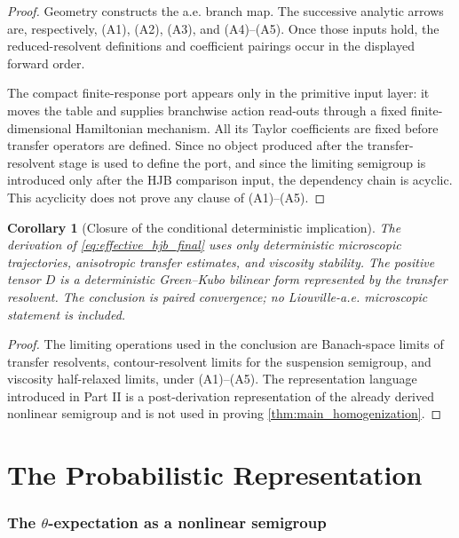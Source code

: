 \documentclass[12pt, letterpaper]{amsart}
\newcommand{\ThetaExpectation}{$\theta$-expectation}
\theoremstyle{plain}
\newtheorem{corollary}[theorem]{Corollary}
\theoremstyle{definition}
\theoremstyle{remark}
\begin{document}
\begin{proof}
Geometry constructs the a.e. branch map.  The successive analytic arrows are,
respectively, \textup{(A1)}, \textup{(A2)}, \textup{(A3)}, and
\textup{(A4)--(A5)}.  Once those inputs hold, the reduced-resolvent definitions
and coefficient pairings occur in the displayed forward order.

The compact finite-response port appears only in the primitive input layer: it
moves the table and supplies branchwise action read-outs through a fixed
finite-dimensional Hamiltonian mechanism.  All its Taylor coefficients are fixed
before transfer operators are defined.  Since no object produced after the
transfer-resolvent stage is used to define the port, and since the limiting
semigroup is introduced only after the HJB comparison input, the dependency
chain is acyclic.  This acyclicity does not prove any clause of
\textup{(A1)--(A5)}.
\end{proof}

\begin{corollary}[Closure of the conditional deterministic implication]
\label{cor:no_probability_in_first_part}
The derivation of \cref{eq:effective_hjb_final} uses only deterministic microscopic trajectories, anisotropic transfer estimates, and viscosity stability.  The positive tensor $D$ is a deterministic
Green--Kubo bilinear form represented by the transfer resolvent.  The conclusion
is paired convergence; no Liouville-a.e. microscopic statement is included.
\end{corollary}

\begin{proof}
The limiting operations used in the conclusion are Banach-space limits of
transfer resolvents, contour-resolvent limits for the suspension semigroup, and
viscosity half-relaxed limits, under \textup{(A1)--(A5)}.  The representation language introduced in
Part II is a post-derivation representation of the already derived nonlinear
semigroup and is not used in proving \cref{thm:main_homogenization}.
\end{proof}


\part{The Probabilistic Representation}
\label{part:ii}

\section{The \texorpdfstring{\ThetaExpectation{}}{theta-Expectation} as a nonlinear semigroup}
\label{sec:theta_expectation_corrected}
\end{document}

